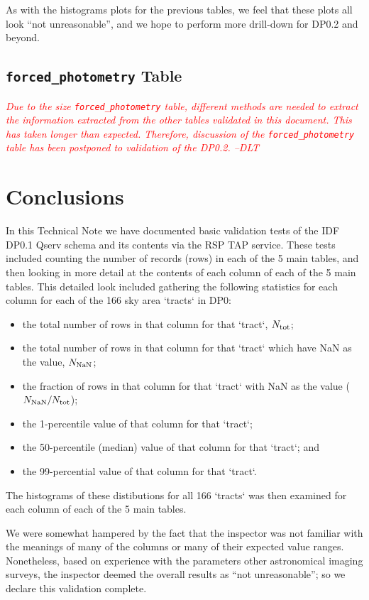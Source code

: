 \documentclass[DM,authoryear,toc]{lsstdoc}
\begin{document}
As with the histograms plots for the previous tables, we feel that
these plots all look ``not unreasonable'', and we hope to perform more
drill-down for DP0.2 and beyond.


\subsection{\texttt{forced\_photometry} Table} \label{sec:forced_photometry}


\textcolor{red}{\em{Due to the size \texttt{forced\_photometry} table, different methods are needed to extract the information extracted from the other tables validated in this document.  This has taken longer than expected.  Therefore, discussion of the \texttt{forced\_photometry} table has been postponed to validation of the DP0.2. --DLT}}


\section{Conclusions} \label{sec:conclusions}

In this Technical Note we have documented basic validation tests of
the IDF DP0.1 Qserv schema and its contents via the RSP TAP service.
These tests included counting the number of records (rows) in each of
the 5 main tables, and then looking in more detail at the contents of
each column of each of the 5 main tables.  This detailed look included
gathering the following statistics for each column for each of the 166
sky area `tracts` in DP0:
\begin{itemize}
\item the total number of rows in that column for that `tract`, $N_{\rm tot}$;
\item the total number of rows in that column for that `tract` which have NaN as the value, $N_{\rm NaN}$;
\item the fraction of rows in that column for that `tract` with NaN as the value ($N_{\rm NaN} / N_{\rm tot}$);
\item the 1-percentile value of that column for that `tract`;
\item the 50-percentile (median) value of that column for that `tract`; and 
\item the 99-percential value of that column for that `tract`.
\end{itemize}
The histograms of these distibutions for all 166 `tracts` was then
examined for each column of each of the 5 main tables.

We were somewhat hampered by the fact that the inspector was not
familiar with the meanings of many of the columns or many of their
expected value ranges.  Nonetheless, based on experience with the
parameters other astronomical imaging surveys, the inspector deemed
the overall results as ``not unreasonable''; so we declare this
validation complete.
\end{document}
